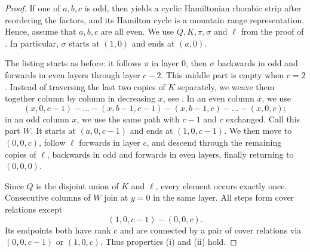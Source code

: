 \documentclass[fontsize=11pt,a4paper,DIV=12]{scrartcl}
\begin{document}
\begin{proof}
	If one of $a,b,c$ is odd, then  yields a cyclic Hamiltonian rhombic strip after reordering the factors, and its Hamilton cycle is a mountain range representation. Hence, assume that $a,b,c$ are all even. We use $Q,K,\pi,\sigma$ and $\ell$ from the proof of . In particular, $\sigma$ starts at $(1,0)$ and ends at $(a,0)$.

	The listing starts as before: it follows $\pi$ in layer $0$, then $\sigma$ backwards in odd and forwards in even layers through layer $c-2$. This middle part is empty when $c=2$. Instead of traversing the last two copies of $K$ separately, we weave them together column by column in decreasing $x$, see . In an even column $x$, we use
	\[
		(x,0,c-1)-\ldots-(x,b-1,c-1)-(x,b-1,c)-\ldots-(x,0,c);
	\]
	in an odd column $x$, we use the same path with $c-1$ and $c$ exchanged. Call this part $W$. It starts at $(a,0,c-1)$ and ends at $(1,0,c-1)$. We then move to $(0,0,c)$, follow $\ell$ forwards in layer $c$, and descend through the remaining copies of $\ell$, backwards in odd and forwards in even layers, finally returning to $(0,0,0)$.

	Since $Q$ is the disjoint union of $K$ and $\ell$, every element occurs exactly once. Consecutive columns of $W$ join at $y=0$ in the same layer. All steps form cover relations except
	\[
		(1,0,c-1)-(0,0,c).
	\]
	Its endpoints both have rank $c$ and are connected by a pair of cover relations via $(0,0,c-1)$ or $(1,0,c)$. Thus properties (i) and (ii) hold.


\end{proof}
\end{document}
